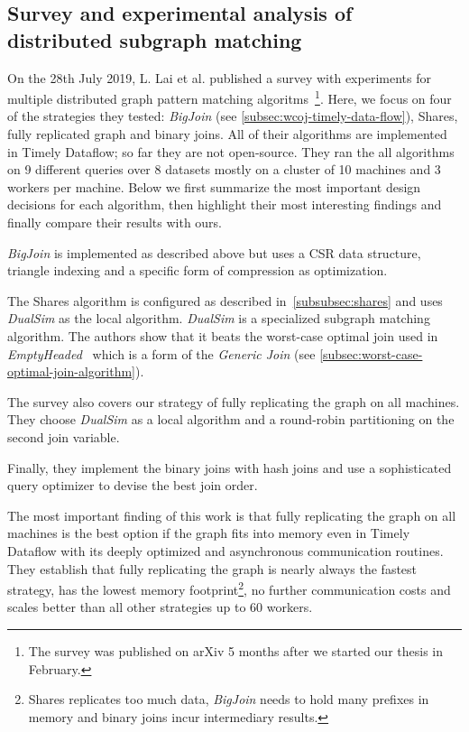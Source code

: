 
\subsection{Survey and experimental analysis of distributed subgraph matching}
On the 28th July 2019, L. Lai et al. published a survey with experiments for multiple
distributed graph pattern matching algoritms~\cite{longbin}\footnote{The survey was published on arXiv 5 months after we started our
thesis in
February.}.
Here, we focus on four of the strategies they tested: \textit{BigJoin} (see \cref{subsec:wcoj-timely-data-flow}),
Shares, fully replicated graph and binary joins.
All of their algorithms are implemented in Timely Dataflow;
so far they are not open-source.
They ran the all algorithms on 9 different queries over 8 datasets mostly on a cluster of 10 machines
and 3 workers per machine.
Below we first summarize the most important design decisions for each algorithm, then
highlight their most interesting findings and finally compare their results with ours.

\textit{BigJoin} is implemented as described above but uses a \textsc{CSR} data structure,
triangle indexing and a specific form of compression as optimization.

The Shares algorithm is configured as described in~\cref{subsubsec:shares} and uses
\textit{DualSim} as the local algorithm.
\textit{DualSim} is a specialized subgraph matching algorithm.
The authors show that it beats the worst-case optimal join used in \textit{EmptyHeaded}~\cite{emptyheaded}
which is a form of the \textit{Generic Join} (see \cref{subsec:worst-case-optimal-join-algorithm}).

The survey also covers our strategy of fully replicating the graph on all machines.
They choose \textit{DualSim} as a local algorithm and a round-robin partitioning on the
second join variable.

Finally, they implement the binary joins with hash joins and use a sophisticated query optimizer
to devise the best join order.

The most important finding of this work is that fully replicating the graph on all machines
is the best option if the graph fits into memory even in Timely Dataflow with its deeply
optimized and asynchronous communication routines.
They establish that fully replicating the graph is nearly always the fastest strategy,
has the lowest memory footprint\footnote{Shares replicates too much data,
\textit{BigJoin} needs to hold many prefixes in memory and binary joins incur intermediary results.}, no
further
communication costs and scales better
than
all other strategies up to 60 workers.

